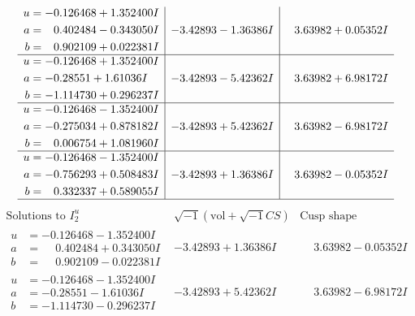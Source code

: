 \documentclass[1p]{elsarticle_modified}
\theoremstyle{definition}
\newcommand{\I}{\sqrt{-1}}
\begin{document}
$$\begin{array}{c|c|c}
\begin{aligned}
u &= -0.126468 + 1.352400 I \\
a &= \phantom{-}0.402484 - 0.343050 I \\
b &= \phantom{-}0.902109 + 0.022381 I\end{aligned}
 & -3.42893 - 1.36386 I & \phantom{-}3.63982 + 0.05352 I \\ \hline\begin{aligned}
u &= -0.126468 + 1.352400 I \\
a &= -0.28551 + 1.61036 I \\
b &= -1.114730 + 0.296237 I\end{aligned}
 & -3.42893 - 5.42362 I & \phantom{-}3.63982 + 6.98172 I \\ \hline\begin{aligned}
u &= -0.126468 - 1.352400 I \\
a &= -0.275034 + 0.878182 I \\
b &= \phantom{-}0.006754 + 1.081960 I\end{aligned}
 & -3.42893 + 5.42362 I & \phantom{-}3.63982 - 6.98172 I \\ \hline\begin{aligned}
u &= -0.126468 - 1.352400 I \\
a &= -0.756293 + 0.508483 I \\
b &= \phantom{-}0.332337 + 0.589055 I\end{aligned}
 & -3.42893 + 1.36386 I & \phantom{-}3.63982 - 0.05352 I\\
 \hline 
 \end{array}$$\newpage$$\begin{array}{c|c|c}  
\text{Solutions to }I^u_{2}& \I (\text{vol} + \sqrt{-1}CS) & \text{Cusp shape}\\
 \hline 
\begin{aligned}
u &= -0.126468 - 1.352400 I \\
a &= \phantom{-}0.402484 + 0.343050 I \\
b &= \phantom{-}0.902109 - 0.022381 I\end{aligned}
 & -3.42893 + 1.36386 I & \phantom{-}3.63982 - 0.05352 I \\ \hline\begin{aligned}
u &= -0.126468 - 1.352400 I \\
a &= -0.28551 - 1.61036 I \\
b &= -1.114730 - 0.296237 I\end{aligned}
 & -3.42893 + 5.42362 I & \phantom{-}3.63982 - 6.98172 I \\ \hline\begin{aligned}

\end{aligned}
\end{array}$$
\end{document}
